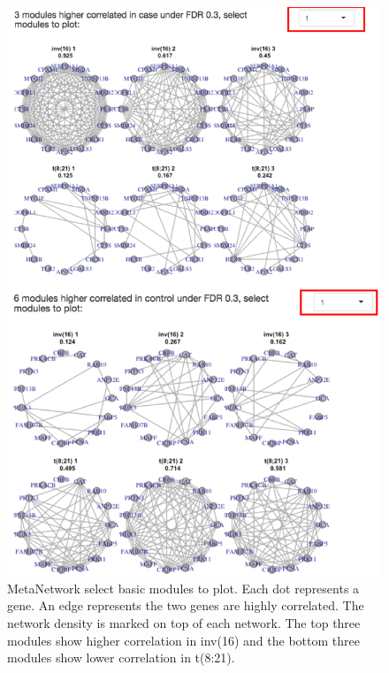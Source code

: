 \begin{figure}[H]
\begin{center}
\includegraphics[scale=0.7]{./figure/MetaNetwork/MetaNetworkBMplot.png}
\caption{MetaNetwork select basic modules to plot.
Each dot represents a gene.
An edge represents the two genes are highly correlated.
The network density is marked on top of each network.
The top three modules show higher correlation in inv(16) and the bottom three modules show lower correlation in t(8:21).
}
\label{fig:MetaNetworkBMplot}
\end{center}
\end{figure}
